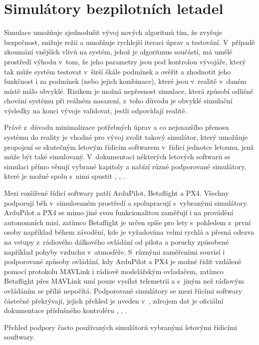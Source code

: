\chapter{Simulátory bezpilotních letadel} \label{chap:sims}
    Simulace umožňuje zjednodušit vývoj nových algoritmů tím, že zvyšuje bezpečnost, snižuje režii a umožňuje rychlejší iteraci úprav a testování. V~případě zkoumání vnějších vlivů na systém, jehož je algoritmus součástí, má umělé prostředí výhodu v~tom, že jeho parametry jsou pod kontrolou vývojáře, který tak může systém testovat v~širší škále podmínek a ověřit a zhodnotit jeho funkčnost i za podmínek (nebo jejich kombinace), které jsou v~realitě v~daném místě málo obvyklé. Rizikem je možná nepřesnost simulace, která způsobí odlišné chování systému při reálném nasazení, z~toho důvodu je obvyklé simulační výsledky na konci vývoje validovat, jestli odpovídají realitě.

    Právě z~důvodu minimalizace potřebných úprav a co nejsnazšího přenosu systému do reality je vhodné pro vývoj zvolit takový simulátor, který umožňuje propojení se skutečným letovým řídicím softwarem v~řídicí jednotce letounu, jenž může být také simulovaný. V~dokumentaci některých letových softwarů se simulaci přímo věnují vybrané kapitoly a nabízí různé podporované simulátory, které je možné spolu s~nimi spustit \cite{px4:simulation}, \cite{ardupilot:simulation}, \cite{betaflight:simulation}.

    Mezi rozšířené řídicí softwary patří ArduPilot, Betaflight a PX4. Všechny podporují běh v~simulovaném prostředí a spolupracují s~vybranými simulátory. ArduPilot a PX4 se mimo jiné svou funkcionalitou zaměřují i na provádění autonomních misí, zatímco Betaflight je určen spíše pro lety s~pohledem z~první osoby například během závodění, kde je vyžadována velmi rychlá a přesná odezva na vstupy z~rádiového dálkového ovládání od pilota a poruchy způsobené například pohyby vzduchu v~atmosféře. S~různými zaměřeními souvisí i podporované způsoby ovládání, kdy ArduPilot a PX4 je možné řídit vzdáleně pomocí protokolu MAVLink i rádiově modelářským ovladačem, zatímco Betaflight přes MAVLink umí pouze vysílat telemetrii a s~jiným než rádiovým ovládáním se příliš nepočítá. Podporované simulátory se mezi říicími softwary částečně překrývají, jejich přehled je uveden v~, zdrojem dat je oficiální dokumentace příslušného kontroléru \cite{px4:simulation}, \cite{ardupilot:simulation}, \cite{betaflight:simulation}.

    \begin{table}
        \centering
        
        \caption[Simulátory podporované kontrolérem letounu]{Přehled podpory často používaných simulátorů vybranými letovými řídicími souftwary.}
        \label{tab:sims}
    \end{table}

